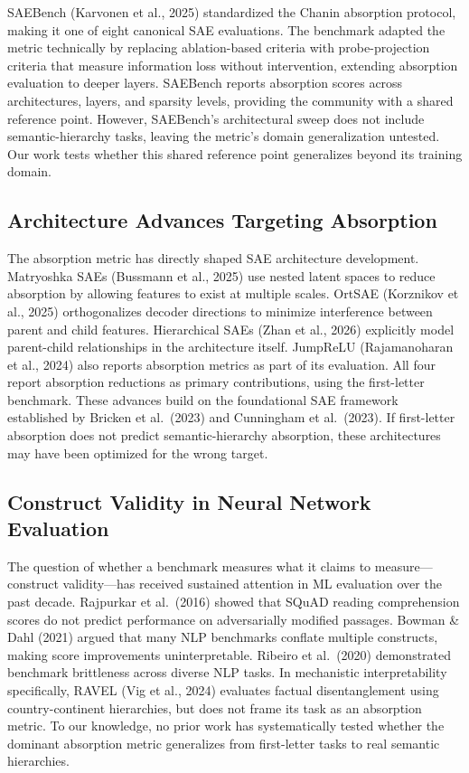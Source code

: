 \documentclass{article}
\begin{document}
SAEBench (Karvonen et al., 2025) standardized the Chanin absorption protocol, making it one of eight canonical SAE evaluations. The benchmark adapted the metric technically by replacing ablation-based criteria with probe-projection criteria that measure information loss without intervention, extending absorption evaluation to deeper layers. SAEBench reports absorption scores across architectures, layers, and sparsity levels, providing the community with a shared reference point. However, SAEBench's architectural sweep does not include semantic-hierarchy tasks, leaving the metric's domain generalization untested. Our work tests whether this shared reference point generalizes beyond its training domain.

\subsection{Architecture Advances Targeting Absorption}

The absorption metric has directly shaped SAE architecture development. Matryoshka SAEs (Bussmann et al., 2025) use nested latent spaces to reduce absorption by allowing features to exist at multiple scales. OrtSAE (Korznikov et al., 2025) orthogonalizes decoder directions to minimize interference between parent and child features. Hierarchical SAEs (Zhan et al., 2026) explicitly model parent-child relationships in the architecture itself. JumpReLU (Rajamanoharan et al., 2024) also reports absorption metrics as part of its evaluation. All four report absorption reductions as primary contributions, using the first-letter benchmark. These advances build on the foundational SAE framework established by Bricken et al.~(2023) and Cunningham et al.~(2023). If first-letter absorption does not predict semantic-hierarchy absorption, these architectures may have been optimized for the wrong target.

\subsection{Construct Validity in Neural Network Evaluation}

The question of whether a benchmark measures what it claims to measure---construct validity---has received sustained attention in ML evaluation over the past decade. Rajpurkar et al.~(2016) showed that SQuAD reading comprehension scores do not predict performance on adversarially modified passages. Bowman \& Dahl (2021) argued that many NLP benchmarks conflate multiple constructs, making score improvements uninterpretable. Ribeiro et al.~(2020) demonstrated benchmark brittleness across diverse NLP tasks. In mechanistic interpretability specifically, RAVEL (Vig et al., 2024) evaluates factual disentanglement using country-continent hierarchies, but does not frame its task as an absorption metric. To our knowledge, no prior work has systematically tested whether the dominant absorption metric generalizes from first-letter tasks to real semantic hierarchies.
\end{document}
